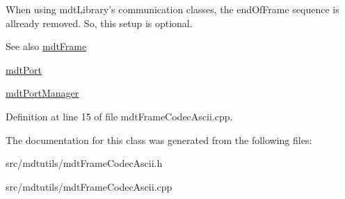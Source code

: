 When using mdtLibrary's communication classes, the endOfFrame sequence is allready removed. So, this setup is optional. \begin{DoxySeeAlso}{See also}
\hyperlink{classmdt_frame}{mdtFrame} 

\hyperlink{classmdt_port}{mdtPort} 

\hyperlink{classmdt_port_manager}{mdtPortManager} 
\end{DoxySeeAlso}


Definition at line 15 of file mdtFrameCodecAscii.cpp.



The documentation for this class was generated from the following files:\begin{DoxyCompactItemize}
\item 
src/mdtutils/mdtFrameCodecAscii.h\item 
src/mdtutils/mdtFrameCodecAscii.cpp\end{DoxyCompactItemize}
